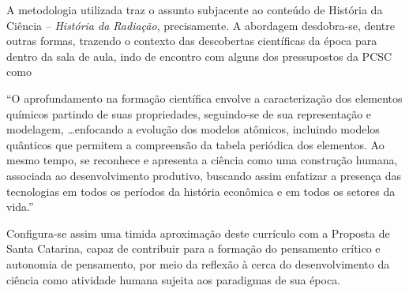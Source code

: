 A metodologia utilizada traz o assunto subjacente ao conteúdo de História da Ciência -- \emph{História da Radiação}, precisamente. A abordagem desdobra-se, dentre outras formas, trazendo o contexto das descobertas científicas da época para dentro da sala de aula, indo de encontro com alguns dos pressupostos da \ac{PCSC} como

\begin{citacao}
    ``O aprofundamento na formação científica envolve a caracterização dos elementos químicos partindo de suas propriedades, seguindo-se de sua representação e modelagem, \ldots enfocando a evolução dos modelos atômicos, incluindo modelos quânticos que permitem a compreensão da tabela periódica dos elementos. Ao mesmo tempo, se reconhece e apresenta a ciência como uma construção humana, associada ao desenvolvimento produtivo, buscando assim enfatizar a presença das tecnologias em todos os períodos da história econômica e em todos os setores da vida.'' 
\end{citacao}
Configura-se assim uma timida aproximação deste currículo com a Proposta de Santa Catarina, capaz de contribuir para a formação do pensamento crítico e autonomia de pensamento, por meio da reflexão à cerca do desenvolvimento da ciência como atividade humana sujeita aos paradigmas de sua época.